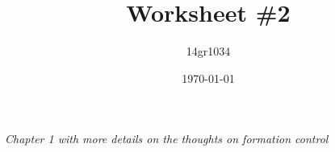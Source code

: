 \documentclass[a4paper,11pt,oneside,fleqn]{memoir}
\begin{document}
\author{14gr1034}
\title{Worksheet \#2}
\date{\today}
\maketitle
\begin{center}
\textit{Chapter 1 with more details on the thoughts on formation
control}
\end{center}




%
\end{document}
